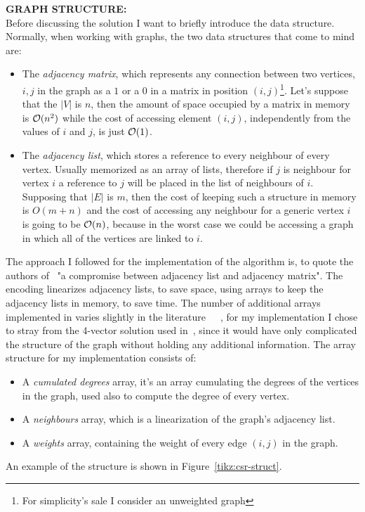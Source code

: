 \documentclass[a4paper,10pt]{article}
\begin{document}
\bigskip
{}
\makeatletter{}\makeatother\label{sec:graph-structure}
\noindent
\textbf{GRAPH STRUCTURE:}
\\
Before discussing the solution I want to briefly introduce the data structure. Normally, when working with graphs, the two data structures that come to mind are:
\begin{itemize}
	\item The \emph{adjacency matrix}, which represents any connection between two vertices, $i,
		      j$ in the graph as a $1$ or a $0$ in a matrix in position $(i, j)$\footnote{For simplicity's sale I consider an unweighted graph}. Let's suppose that the $|V|$ is $n$, then the amount of space occupied by a matrix in memory is $\mathcal{O}(n^2)$ while the cost of accessing element $(i, j)$, independently from the values of $i$ and $j$, is just $\mathcal{O}(1)$.
	\item The \emph{adjacency list}, which stores a reference to every neighbour of every vertex. Usually memorized as an array of lists, therefore if $j$ is neighbour for vertex $i$ a reference to $j$ will be placed in the list of neighbours of $i$. Supposing that $|E|$ is $m$, then the cost of keeping such a structure in memory is $O(m + n)$ and the cost of accessing any neighbour for a generic vertex $i$ is going to be $\mathcal{O}(n)$, because in the worst case we could be accessing a graph in which all of the vertices are linked to $i$.
\end{itemize}
The approach I followed for the implementation of the algorithm is, to quote the authors
of~\cite{generic-he-boruvka} "a compromise between adjacency list and adjacency matrix". The \csr
encoding linearizes adjacency lists, to save space, using arrays to keep the adjacency lists in
memory, to save time. The number of additional arrays implemented in \csr varies slightly in the literature~\cite{csr-kelly}~\cite{csr-wheatman}~\cite{generic-he-boruvka}, for my implementation I chose to stray from the 4-vector solution used in~\cite{generic-he-boruvka}, since it would have only complicated the structure of the graph without holding any additional information.
The array structure for my implementation consists of:
\begin{itemize}
	\item A \emph{cumulated degrees} array, it's an array cumulating the degrees of the vertices in the graph, used also to compute the degree of every vertex.
	\item A \emph{neighbours} array, which is a linearization of the graph's adjacency list.
	\item A \emph{weights} array, containing the weight of every edge $(i, j)$ in the graph.
\end{itemize}
An example of the \csr structure is shown in Figure~\ref{tikz:csr-struct}.
\end{document}
